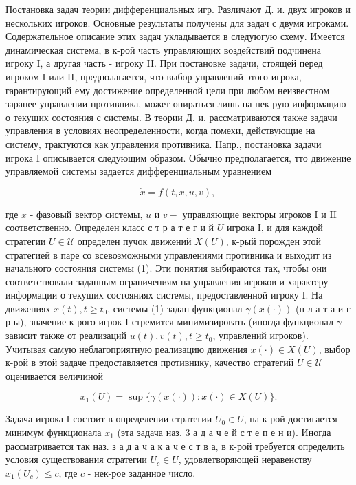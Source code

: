 \documentclass[10pt]{article}
\begin{document}
Постановка задач теории дифференциальных игр. Различают Д. и. двух игроков и нескольких игроков. Основные результаты получены для задач с двумя игроками. Содержательное описание этих задач укладывается в следуюгую схему. Имеется динамическая система, в к-рой часть управляющих воздействий подчинена игроку I, а другая часть - игроку II. При постановке задачи, стоящей перед игроком I или II, предполагается, что выбор управлений этого игрока, гарантирующий ему достижение определенной цели при любом неизвестном заранее управлении противника, может опираться лишь на нек-рую информацию о текущих состояния с системы. В теории Д. и. рассматриваются также задачи управления в условиях неопределенности, когда помехи, действующие на систему, трактуются как управления противника. Напр., постановка задачи игрока I описывается следующим образом. Обычно предполагается, тто движение управляемой системы задается дифференциальным уравнением



\[

\dot{x}=f(t, x, u, v) \text {, }

\]



где $x$ - фазовый вектор системы, $u$ и $v-$ управляющие векторы игроков I и II соответственно. Определен класс с т р а т е г и й $U$ игрока I, и для каждой стратегии $U \in \mathcal{U}$ определен пучок движений $X(U)$, к-рый порожден этой стратегией в паре со всевозможными управлениями противника и выходит из начального состояния системы (1). Эти понятия выбираются так, чтобы они соответствовали заданным ограничениям на управления игроков и характеру информации о текущих состояниях системы, предоставленной игроку I. На движениях $x(t), t \geqslant t_{0}$, системы (1) задан функционал $\gamma(x(\cdot))$ (п л а т а и г р ы), значение к-рого игрок I стремится минимизировать (иногда функционал $\gamma$ зависит также от реализаций $u(t), v(t), t \geqslant t_{0}$, управлений игроков). Учитывая самую неблагоприятную реализацию движения $x(\cdot) \in X(U)$, выбор к-рой в этой задаче предоставляется противнику, качество стратегий $U \in \mathcal{U}$ оценивается величиной



\[

x_{1}(U)=\sup \{\gamma(x(\cdot)): x(\cdot) \in X(U)\} .

\]



Задача игрока I состоит в определении стратегии $U_{0} \in U$, на к-рой достигается минимум функционала $x_{1}$ (эта задача наз. 3 а д а ч е й с т е п е н и). Иногда рассматривается так наз. з а д а ч а к а ч е с т в а, в к-рой требуется определить условия существования стратегии $U_{c} \in U$, удовлетворяющей неравенству $x_{1}\left(U_{c}\right) \leqslant c$, где $c$ - нек-рое заданное число.
\end{document}
